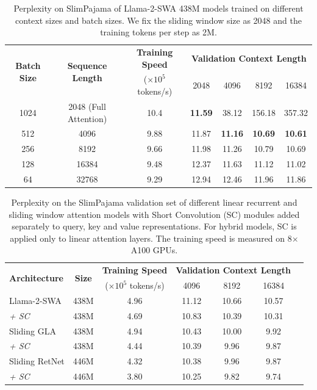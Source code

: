 \documentclass{article}
\begin{document}
\begin{table}[h]
\centering
\small
\caption{Perplexity on SlimPajama of Llama-2-SWA 438M models trained on different context sizes and batch sizes. We fix the sliding window size as 2048 and the training tokens per step as 2M.} 

\begin{tabular}{ccccccc}
\toprule
\multirow{2}{*}{\bf Batch Size} & \multirow{2}{*}{\bf Sequence Length }   & \bf Training Speed &  \multicolumn{4 }{c}{\bf Validation Context Length} \\
  & &  ($\times 10^5$ tokens/s) &  2048  &  4096  &   8192 &   16384 \\ 
\midrule
1024      & 2048 (Full Attention)    & 10.4 & \bf 11.59 & 38.12 & 156.18 & 357.32 \\
512 & 4096 & 9.88 &  11.87 &  \bf 11.16 & \bf 10.69 & \bf 10.61 \\
256 & 8192  & 9.66 & 11.98  & 11.26 & 10.79 & 10.69  \\
128 & 16384  & 9.48 & 12.37  & 11.63 & 11.12 & 11.02  \\
64 & 32768  & 9.29 & 12.94  & 12.46 & 11.96 & 11.86  \\

\bottomrule
\end{tabular}
\label{tab:swa}
\end{table}

\begin{table}[h]
\centering
\small
\caption{Perplexity on the SlimPajama validation set of different linear recurrent and sliding window attention models with Short Convolution (SC) modules added separately to query, key and value representations. For hybrid models, SC is applied only to linear attention layers. The training speed is measured on 8$\times$A100 GPUs.} 

\begin{tabular}{lcccccc}
\toprule
\multirow{2}{*}{\bf Architecture} & \multirow{2}{*}{\bf Size }   & \bf Training Speed &  \multicolumn{3 }{c}{\bf Validation Context Length} \\
  & &  ($\times 10^5$ tokens/s) &  4096  &  8192  &   16384 \\ 
\midrule
Llama-2-SWA & 438M &  4.96 & 11.12 & 10.66 & 10.57 \\
 \quad \quad \quad \quad \emph{+ SC} & 438M &  4.69 & 10.83 & 10.39 & 10.31 \\
 \midrule
Sliding GLA      & 438M     & 4.94 & 10.43 & 10.00 & 9.92 \\
 \quad \quad \quad \quad\emph{+ SC}    & 438M     & 4.44 & 10.39 & 9.96 & 9.87 \\
  \midrule
Sliding RetNet & 446M & 4.32 & 10.38 & 9.96 & 9.87 \\
 \quad \quad \quad \quad \emph{+ SC} & 446M & 3.80 & 10.25 & 9.82 & 9.74 \\
 
\bottomrule
\end{tabular}
\label{tab:SC}
\end{table}
\end{document}
